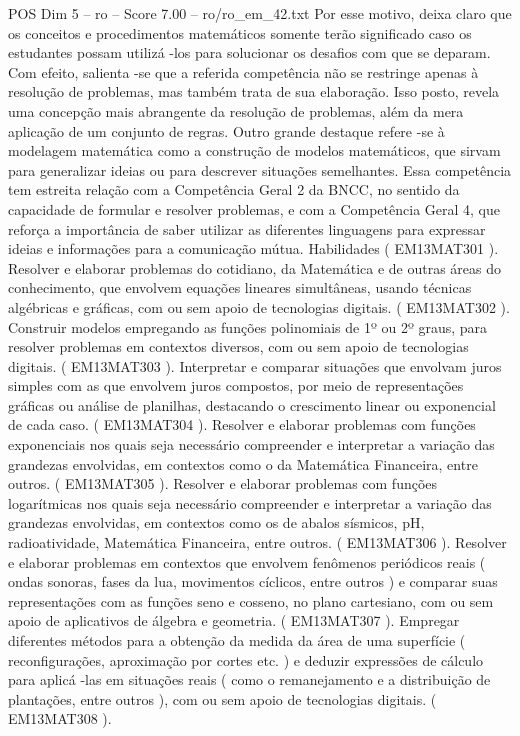 \begin{textsample}{POS Dim 5 – ro – Score 7.00 – ro/ro\_em\_42.txt}
Por esse motivo, deixa claro que os conceitos e procedimentos matemáticos somente terão significado caso os estudantes possam utilizá -los para solucionar os desafios com que se deparam.
Com efeito, salienta -se que a referida competência não se restringe apenas à resolução de problemas, mas também trata de sua elaboração.
Isso posto, revela uma concepção mais abrangente da resolução de problemas, além da mera aplicação de um conjunto de regras.
Outro grande destaque refere -se à modelagem matemática como a construção de modelos matemáticos, que sirvam para generalizar ideias ou para descrever situações semelhantes.
Essa competência tem estreita relação com a Competência Geral 2 da BNCC, no sentido da capacidade de formular e resolver problemas, e com a Competência Geral 4, que reforça a importância de saber utilizar as diferentes linguagens para expressar ideias e informações para a comunicação mútua.
Habilidades ( EM13MAT301 ).
Resolver e elaborar problemas do cotidiano, da Matemática e de outras áreas do conhecimento, que envolvem equações lineares simultâneas, usando técnicas algébricas e gráficas, com ou sem apoio de tecnologias digitais. ( EM13MAT302 ).
Construir modelos empregando as funções polinomiais de 1º ou 2º graus, para resolver problemas em contextos diversos, com ou sem apoio de tecnologias digitais. ( EM13MAT303 ).
Interpretar e comparar situações que envolvam juros simples com as que envolvem juros compostos, por meio de representações gráficas ou análise de planilhas, destacando o crescimento linear ou exponencial de cada caso. ( EM13MAT304 ).
Resolver e elaborar problemas com funções exponenciais nos quais seja necessário compreender e interpretar a variação das grandezas envolvidas, em contextos como o da Matemática Financeira, entre outros. ( EM13MAT305 ).
Resolver e elaborar problemas com funções logarítmicas nos quais seja necessário compreender e interpretar a variação das grandezas envolvidas, em contextos como os de abalos sísmicos, pH, radioatividade, Matemática Financeira, entre outros. ( EM13MAT306 ).
Resolver e elaborar problemas em contextos que envolvem fenômenos periódicos reais ( ondas sonoras, fases da lua, movimentos cíclicos, entre outros ) e comparar suas representações com as funções seno e cosseno, no plano cartesiano, com ou sem apoio de aplicativos de álgebra e geometria. ( EM13MAT307 ).
Empregar diferentes métodos para a obtenção da medida da área de uma superfície ( reconfigurações, aproximação por cortes etc. ) e deduzir expressões de cálculo para aplicá -las em situações reais ( como o remanejamento e a distribuição de plantações, entre outros ), com ou sem apoio de tecnologias digitais. ( EM13MAT308 ).

\end{textsample}
